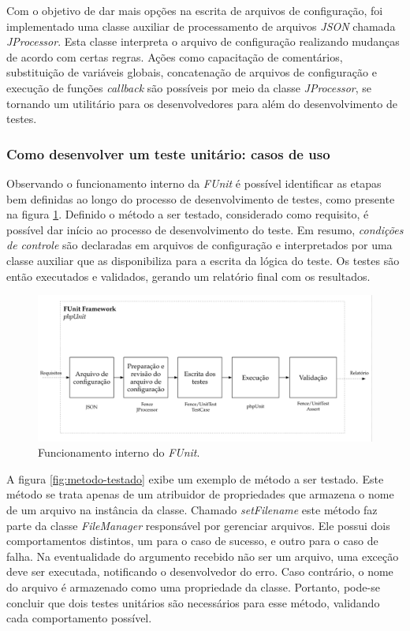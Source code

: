 Com o objetivo de dar mais opções na escrita de arquivos de configuração, foi implementado uma classe auxiliar de processamento de arquivos \emph{JSON} chamada \emph{JProcessor}. Esta classe interpreta o arquivo de configuração realizando mudanças de acordo com certas regras. Ações como capacitação de comentários, substituição de variáveis globais, concatenação de arquivos de configuração e execução de funções \emph{callback} são possíveis por meio da classe \emph{JProcessor}, se tornando um utilitário para os desenvolvedores para além do desenvolvimento de testes.

\hypertarget{como-desenvolver-um-teste-unitario}{%
\subsubsection{Como desenvolver um teste unitário: casos de uso}\label{como-desenvolver-um-teste-unitario}}

Observando o funcionamento interno da \emph{FUnit} é possível identificar as etapas bem definidas ao longo do processo de desenvolvimento de testes, como presente na figura \ref{fig:funit-phpunit}. Definido o método a ser testado, considerado como requisito, é possível dar início ao processo de desenvolvimento do teste. Em resumo, \emph{condições de controle} são declaradas em arquivos de configuração e interpretados por uma classe auxiliar que as disponibiliza para a escrita da lógica do teste. Os testes são então executados e validados, gerando um relatório final com os resultados.

\begin{figure}[H]
    \centering
    \includegraphics[width=14cm]{source/4-solucao/images/funit-phpunit.png}
    \caption{Funcionamento interno do \emph{FUnit}.}
    \label{fig:funit-phpunit}
\end{figure}

A figura \ref{fig:metodo-testado} exibe um exemplo de método a ser testado. Este método se trata apenas de um atribuidor de propriedades que armazena o nome de um arquivo na instância da classe. Chamado \emph{setFilename} este método faz parte da classe \emph{FileManager} responsável por gerenciar arquivos. Ele possui dois comportamentos distintos, um para o caso de sucesso, e outro para o caso de falha. Na eventualidade do argumento recebido não ser um arquivo, uma exceção deve ser executada, notificando o desenvolvedor do erro. Caso contrário, o nome do arquivo é armazenado como uma propriedade da classe. Portanto, pode-se concluir que dois testes unitários são necessários para esse método, validando cada comportamento possível.

